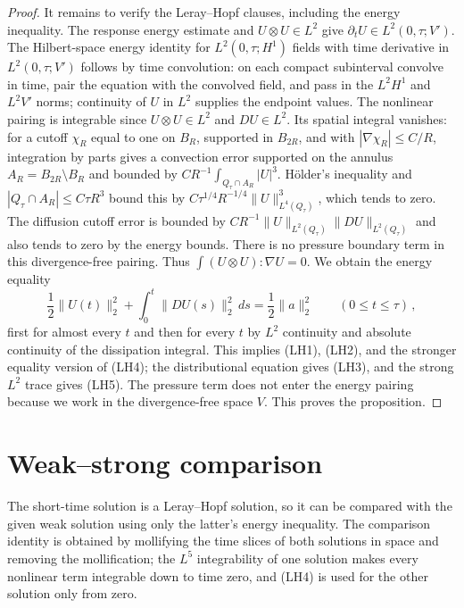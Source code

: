 \documentclass[11pt,letterpaper]{article}
\numberwithin{equation}{section}
\theoremstyle{plain}
\theoremstyle{definition}
\theoremstyle{remark}
\begin{document}
\begin{proof}
It remains to verify the Leray--Hopf clauses, including the energy inequality. The response energy estimate and $U\otimes U\in L^2$ give $\partial_tU\in L^2(0,\tau;V')$. The Hilbert-space energy identity for $L^2(0,\tau;H^1)$ fields with time derivative in $L^2(0,\tau;V')$ follows by time convolution: on each compact subinterval convolve in time, pair the equation with the convolved field, and pass in the $L^2H^1$ and $L^2V'$ norms; continuity of $U$ in $L^2$ supplies the endpoint values. The nonlinear pairing is integrable since $U\otimes U\in L^2$ and $DU\in L^2$. Its spatial integral vanishes: for a cutoff $\chi_R$ equal to one on $B_R$, supported in $B_{2R}$, and with $|\nabla\chi_R|\le C/R$, integration by parts gives a convection error supported on the annulus $A_R=B_{2R}\setminus B_R$ and bounded by $C R^{-1}\int_{Q_\tau\cap A_R}|U|^3$. Hölder's inequality and $|Q_\tau\cap A_R|\le C\tau R^3$ bound this by $C\tau^{1/4}R^{-1/4}\|U\|_{L^4(Q_\tau)}^3$, which tends to zero. The diffusion cutoff error is bounded by $C R^{-1}\|U\|_{L^2(Q_\tau)}\|DU\|_{L^2(Q_\tau)}$ and also tends to zero by the energy bounds. There is no pressure boundary term in this divergence-free pairing. Thus $\int (U\otimes U):\nabla U=0$. We obtain the energy equality
\begin{equation*}
\frac12\|U(t)\|_2^2+\int_0^t\|DU(s)\|_2^2\,ds=\frac12\|a\|_2^2\qquad(0\le t\le\tau)\,,
\end{equation*}
first for almost every $t$ and then for every $t$ by $L^2$ continuity and absolute continuity of the dissipation integral. This implies (LH1), (LH2), and the stronger equality version of (LH4); the distributional equation gives (LH3), and the strong $L^2$ trace gives (LH5). The pressure term does not enter the energy pairing because we work in the divergence-free space $V$. This proves the proposition.
\end{proof}

\section{Weak--strong comparison}\label{sec:pv-serrin}

The short-time solution is a Leray--Hopf solution, so it can be compared with the given weak solution using only the latter's energy inequality. The comparison identity is obtained by mollifying the time slices of both solutions in space and removing the mollification; the $L^5$ integrability of one solution makes every nonlinear term integrable down to time zero, and (LH4) is used for the other solution only from zero.
\end{document}
